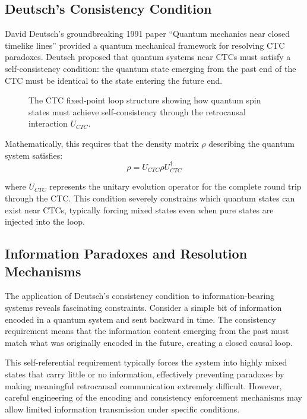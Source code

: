 \documentclass[12pt,a4paper]{article}
\begin{document}
\subsection{Deutsch's Consistency Condition}

David Deutsch's groundbreaking 1991 paper ``Quantum mechanics near closed timelike lines'' provided a quantum mechanical framework for resolving CTC paradoxes. Deutsch proposed that quantum systems near CTCs must satisfy a self-consistency condition: the quantum state emerging from the past end of the CTC must be identical to the state entering the future end.

\begin{figure}[H]
\centering
{}
\caption{The CTC fixed-point loop structure showing how quantum spin states must achieve self-consistency through the retrocausal interaction $U_{CTC}$.}
\end{figure}

Mathematically, this requires that the density matrix $\rho$ describing the quantum system satisfies:
\begin{equation}
\rho = U_{CTC} \rho U_{CTC}^\dagger
\end{equation}

where $U_{CTC}$ represents the unitary evolution operator for the complete round trip through the CTC. This condition severely constrains which quantum states can exist near CTCs, typically forcing mixed states even when pure states are injected into the loop.

\subsection{Information Paradoxes and Resolution Mechanisms}

The application of Deutsch's consistency condition to information-bearing systems reveals fascinating constraints. Consider a simple bit of information encoded in a quantum system and sent backward in time. The consistency requirement means that the information content emerging from the past must match what was originally encoded in the future, creating a closed causal loop.

This self-referential requirement typically forces the system into highly mixed states that carry little or no information, effectively preventing paradoxes by making meaningful retrocausal communication extremely difficult. However, careful engineering of the encoding and consistency enforcement mechanisms may allow limited information transmission under specific conditions.
\end{document}

